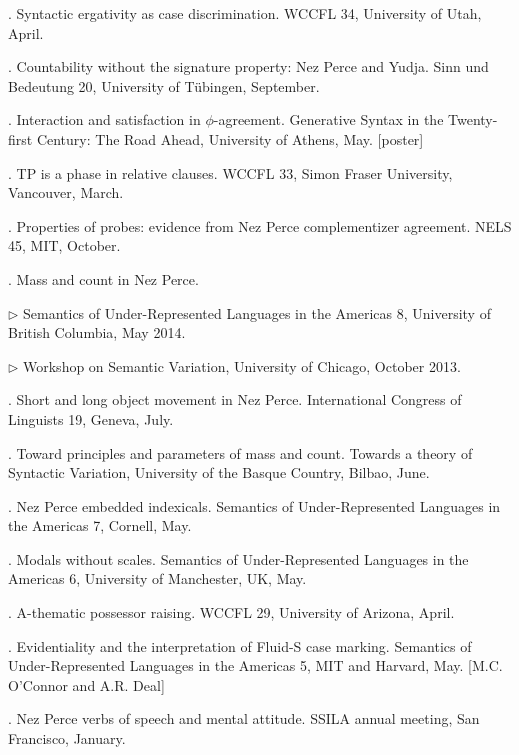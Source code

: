 \documentclass[12pt]{article}
\begin{document}
  . Syntactic ergativity as case discrimination. WCCFL 34, University of Utah, April. %


  . Countability without the signature property: Nez Perce and Yudja. Sinn und Bedeutung 20, University of T\"ubingen, September. 

  . Interaction and satisfaction in $\phi$-agreement. Generative Syntax in the Twenty-first Century: The Road Ahead, University of Athens, May. [poster]
    
  . TP is a phase in relative clauses. WCCFL 33, Simon Fraser University, Vancouver, March.

. Properties of probes: evidence from Nez Perce complementizer agreement. NELS 45, MIT, October. 




. Mass and count in Nez Perce. \nopagebreak

\indd $\rhd$     Semantics of Under-Represented Languages in the Americas 8, University of British Columbia, May 2014. 

\indd $\rhd$ Workshop on Semantic Variation, University of Chicago, October 2013. 





. Short and long object movement in Nez Perce. International Congress of Linguists 19, Geneva, July.




. Toward principles and parameters of mass and count. Towards a theory of Syntactic Variation, University of the Basque Country, Bilbao, June. 




. Nez Perce embedded indexicals. Semantics of Under-Represented Languages in the Americas 7, Cornell, May.  

. Modals without scales. Semantics of Under-Represented Languages in the Americas 6, University of Manchester, UK, May. 

. A-thematic possessor raising. WCCFL 29, University of Arizona, April. 

. Evidentiality and the interpretation of Fluid-S case marking. Semantics of Under-Represented Languages in the Americas 5, MIT and Harvard, May. [M.C. O'Connor and A.R. Deal] 

. Nez Perce verbs of speech and mental attitude. SSILA annual meeting, San Francisco, January. 
\end{document}
